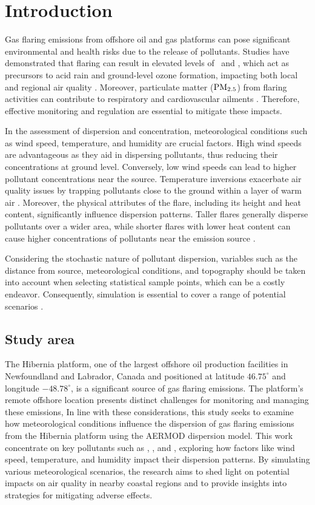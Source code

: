 \section{Introduction}
Gas flaring emissions from offshore oil and gas platforms can pose significant environmental and health risks due to the release of pollutants. Studies have demonstrated that flaring can result in elevated levels of \NOx\ and \SOtwo, which act as precursors to acid rain and ground-level ozone formation, impacting both local and regional air quality \cite{fawole2019dispersion}. Moreover, particulate matter (\(\mathrm{PM}_{2.5}\)) from flaring activities can contribute to respiratory and cardiovascular ailments \cite{khaleghi2023methane}. Therefore, effective monitoring and regulation are essential to mitigate these impacts.

In the assessment of dispersion and concentration, meteorological conditions such as wind speed, temperature, and humidity are crucial factors. High wind speeds are advantageous as they aid in dispersing pollutants, thus reducing their concentrations at ground level. Conversely, low wind speeds can lead to higher pollutant concentrations near the source. Temperature inversions exacerbate air quality issues by trapping pollutants close to the ground within a layer of warm air \cite{an2016atmospheric}. Moreover, the physical attributes of the flare, including its height and heat content, significantly influence dispersion patterns. Taller flares generally disperse pollutants over a wider area, while shorter flares with lower heat content can cause higher concentrations of pollutants near the emission source \cite{mirrezaei2019impact}.

Considering the stochastic nature of pollutant dispersion, variables such as the distance from source, meteorological conditions, and topography should be taken into account when selecting statistical sample points, which can be a costly endeavor. Consequently, simulation is essential to cover a range of potential scenarios \cite{fawole2019dispersion,christoudias2014atmospheric}.

\subsection{Study area}
The Hibernia platform, one of the largest offshore oil production facilities in Newfoundland and Labrador, Canada and positioned at latitude $46.75^\circ$ and longitude $-48.78^\circ$, is a significant source of gas flaring emissions. The platform's remote offshore location presents distinct challenges for monitoring and managing these emissions, In line with these considerations, this study seeks to examine how meteorological conditions influence the dispersion of gas flaring emissions from the Hibernia platform using the AERMOD dispersion model. This work concentrate on key pollutants such as \SOtwo, \NOx, and \PMtwoFive, exploring how factors like wind speed, temperature, and humidity impact their dispersion patterns. By simulating various meteorological scenarios, the research aims to shed light on potential impacts on air quality in nearby coastal regions and to provide insights into strategies for mitigating adverse effects.

